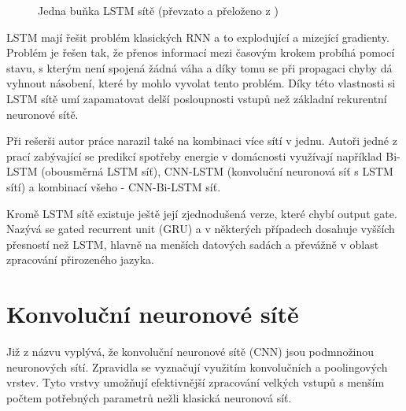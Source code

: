\documentclass[FM,BP,fonts]{tulthesis}
\begin{document}
\begin{figure}[htbp]
	\centering
	\caption{Jedna buňka LSTM sítě (převzato a přeloženo z \cite{colah})}
	\label{fig:my_graph}
\end{figure}

LSTM mají řešit problém klasických RNN a to explodující a mizející gradienty. Problém je řešen tak, že přenos informací mezi časovým krokem probíhá pomocí stavu, s kterým není spojená žádná váha a díky tomu se při propagaci chyby dá vyhnout násobení, které by mohlo vyvolat tento problém. Díky této vlastnosti si LSTM sítě umí zapamatovat delší posloupnosti vstupů než základní rekurentní neuronové sítě.

Při rešerši autor práce narazil také na kombinaci více sítí v jednu. Autoři jedné z prací zabývající se predikcí spotřeby energie v domácnosti \cite{cnn-bi-lstm}	 využívají například Bi-LSTM (obousměrná LSTM síť), CNN-LSTM (konvoluční neuronová síť s LSTM sítí) a kombinací všeho - CNN-Bi-LSTM síť.

Kromě LSTM sítě existuje ještě její zjednodušená verze, které chybí output gate. Nazývá se gated recurrent unit (GRU) a v některých případech dosahuje vyšších přesností než LSTM, hlavně na menších datových sadách a převážně v oblast zpracování přirozeného jazyka. \cite{kynych2018vyuziti}

\section{Konvoluční neuronové sítě}
Již z názvu vyplývá, že konvoluční neuronové sítě (CNN) jsou podmnožinou neuronových sítí. Zpravidla se vyznačují využitím konvolučních a poolingových vrstev. Tyto vrstvy umožňují efektivnější zpracování velkých vstupů s menším počtem potřebných parametrů nežli klasická neuronová síť. 
\end{document}
